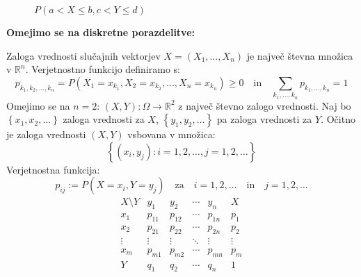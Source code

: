 \documentclass[12pt]{book}
\def\n{\noindent}
\theoremstyle{definition}
\theoremstyle{plain}
\theoremstyle{plain}
\theoremstyle{plain}
\theoremstyle{remark}
\begin{document}
\begin{figure}[H]
    \centering

    \caption{$P(a<X \leq b, c<Y \leq d)$}
    \label{fig:22}
\end{figure}

\n \textbf{Omejimo se na diskretne porazdelitve:}

\n Zaloga vrednosti slučajnih vektorjev $X=\left(X_1, \ldots, X_n\right)$ je največ števna množica v $\mathbb{R}^n$. Verjetnostno funkcijo definiramo s:
$$
p_{k_1, k_2, \ldots, k_n} = P\left(X_1=x_{k_1}, X_2=x_{k_2}, \ldots, X_n=x_{k_n}\right) \geq 0 \quad \text{in} \quad \sum_{k_1, \ldots, k_n} p_{k_1, \ldots, k_n}=1
$$
Omejimo se na $n=2$: $(X, Y): \Omega \to \mathbb{R}^2$ z največ števno zalogo vrednosti. Naj bo $\left\{x_1, x_2, \ldots\right\}$ zaloga vrednosti za $X$, $\left\{y_1, y_2, \ldots\right\}$ pa zaloga vrednosti za $Y$. Očitno je zaloga vrednosti $(X,Y)$ vsbovana v množica:
$$
\left\{\left(x_i, y_j\right): i=1,2, \ldots, j=1,2, \ldots\right\}
$$
Verjetnostna funkcija:
$$
p_{i j}:=P\left(X=x_i, Y=y_j\right) \quad \text{za} \quad i=1, 2, \ldots \quad \text{in} \quad  j=1, 2, \ldots
$$
$$
\begin{array}{c|cccc|c}
    X\setminus Y & y_1 & y_2 & \cdots & y_n & X \\
    \hline x_1 & p_{11} & p_{12} & \cdots & p_{1 n} & p_1 \\
    x_2 & p_{21} & p_{22} & \cdots & p_{2 n} & p_2 \\
    \vdots & \vdots & \vdots & \ddots & \vdots & \vdots \\
    x_m & p_{m 1} & p_{m 2} & \cdots & p_{m n} & p_m \\
    \hline Y & q_1 & q_2 & \cdots & q_n & 1
    \end{array}
$$
\end{document}
